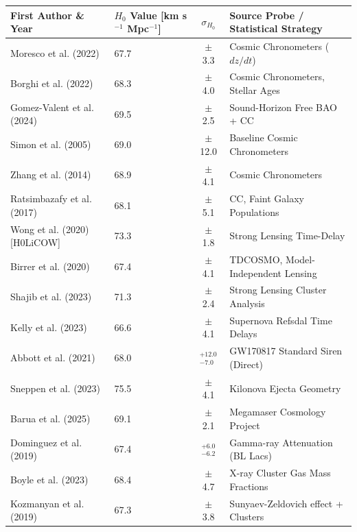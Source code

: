 \documentclass{book}
\begin{document}
	\begin{table}[h!]
		\centering
		\scriptsize
		\begin{tabular}{llcl}
			\hline\hline
			First Author \& Year & $H_0$ Value [km s$^{-1}$ Mpc$^{-1}$] & $\sigma_{H_0}$ & Source Probe / Statistical Strategy \\ 
			\hline
			Moresco et al. (2022)         & 67.7  & $\pm$ 3.3  & Cosmic Chronometers ($d z/d t$) \\
			Borghi et al. (2022)          & 68.3  & $\pm$ 4.0  & Cosmic Chronometers, Stellar Ages \\
			Gomez-Valent et al. (2024)    & 69.5  & $\pm$ 2.5  & Sound-Horizon Free BAO + CC \\
			Simon et al. (2005)           & 69.0  & $\pm$ 12.0 & Baseline Cosmic Chronometers \\
			Zhang et al. (2014)           & 68.9  & $\pm$ 4.1  & Cosmic Chronometers \\
			Ratsimbazafy et al. (2017)    & 68.1  & $\pm$ 5.1  & CC, Faint Galaxy Populations \\
			Wong et al. (2020) [H0LiCOW]  & 73.3  & $\pm$ 1.8  & Strong Lensing Time-Delay \\
			Birrer et al. (2020)          & 67.4  & $\pm$ 4.1  & TDCOSMO, Model-Independent Lensing \\
			Shajib et al. (2023)          & 71.3  & $\pm$ 2.4  & Strong Lensing Cluster Analysis \\
			Kelly et al. (2023)           & 66.6  & $\pm$ 4.1  & Supernova Refsdal Time Delays \\
			Abbott et al. (2021)          & 68.0  & $^{+12.0}_{-7.0}$ & GW170817 Standard Siren (Direct) \\
			Sneppen et al. (2023)         & 75.5  & $\pm$ 4.1  & Kilonova Ejecta Geometry \\
			Barua et al. (2025)           & 69.1  & $\pm$ 2.1  & Megamaser Cosmology Project \\
			Dominguez et al. (2019)       & 67.4  & $^{+6.0}_{-6.2}$ & Gamma-ray Attenuation (BL Lacs) \\
			Boyle et al. (2023)           & 68.4  & $\pm$ 4.7  & X-ray Cluster Gas Mass Fractions \\
			Kozmanyan et al. (2019)       & 67.3  & $\pm$ 3.8  & Sunyaev-Zeldovich effect + Clusters \\

\end{tabular}
\end{table}
\end{document}
